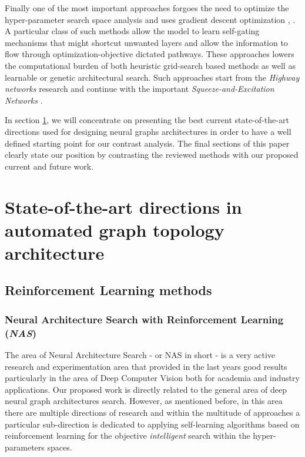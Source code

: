 \documentclass[conference]{IEEEtran}
\begin{document}
Finally one of the most important approaches forgoes the need to optimize the hyper-parameter search space analysis and uses gradient descent optimization \cite{brock2017smash}, \cite{Liu2018}. A particular class of such methods allow the model to learn self-gating mechanisms that might shortcut unwanted layers and allow the information to flow through optimization-objective dictated pathways. These approaches lowers the computational burden of both heuristic grid-search based methods as well as learnable or genetic architectural search. Such approaches start from the \textit{Highway networks} research \cite{srivastava2015highway} and continue with the important \textit{Squeeze-and-Excitation Networks}  \cite{hu2019squeezeandexcitation}.

In section \ref{summary}, we will concentrate on presenting the best current state-of-the-art directions used for designing neural graphs architectures in order to have a well defined starting point for our contrast analysis. The final sections of this paper clearly state our position by contrasting the reviewed methods with our proposed current and future work.

\section{State-of-the-art directions in automated graph topology architecture}
\label{summary}

\subsection{Reinforcement Learning methods}

\subsubsection{Neural Architecture Search with Reinforcement Learning (\textit{NAS})}
\label{summary:nas}

The area of Neural Architecture Search - or NAS in short - is a very active research and experimentation area that provided in the last years  good results particularly in the area of Deep Computer Vision both for academia and industry applications. Our proposed work is directly related to the general area of deep neural graph architectures search. However, as mentioned before, in this area there are multiple directions of research and within the multitude of approaches a particular sub-direction is dedicated to applying self-learning algorithms based on reinforcement learning for the objective \textit{intelligent} search within the hyper-parameters spaces.
\end{document}
